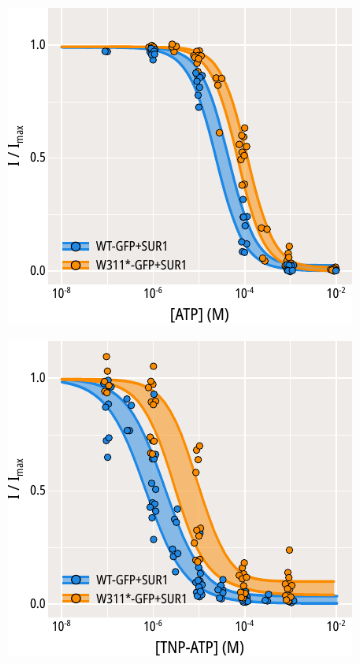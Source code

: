 \begin{figure}[h]
	\centering
	\begin{subfigure}[t]{0.45\textwidth}
		\caption{}\label{ch3fig:atp_inhibition_1}
		\centering
		\includegraphics[width=\textwidth]{atp_inhibition_1.pdf}
	\end{subfigure}
	\hfill
	\begin{subfigure}[t]{0.45\textwidth}
		\caption{}\label{ch3fig:tnpatp_inhibition_1}
		\centering
		\includegraphics[width=\textwidth]{tnpatp_inhibition_1.pdf}

\end{subfigure}
\end{figure}
